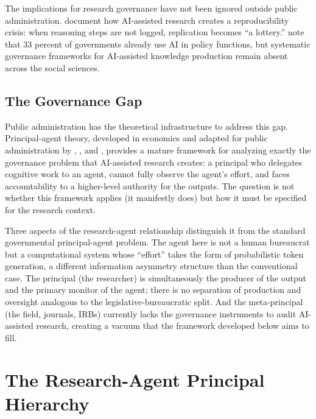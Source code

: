 \documentclass[12pt]{article}
\begin{document}
The implications for research governance have not been ignored outside public administration.
\citet{elephantinthelab2025reproducibility} document how AI-assisted research creates a
reproducibility crisis: when reasoning steps are not logged, replication becomes ``a lottery.''
\citet{oecd2025governing} note that 33 percent of governments already use AI in policy
functions, but systematic governance frameworks for AI-assisted knowledge production remain
absent across the social sciences.

\subsection{The Governance Gap}

Public administration has the theoretical infrastructure to address this gap. Principal-agent
theory, developed in economics \citep{jensen1976theory} and adapted for public administration
by \citet{mitnick1973politicaleconomy}, \citet{moe1984neweconomics}, and \citet{waterman1998agents},
provides a mature framework for analyzing exactly the governance problem that AI-assisted
research creates: a principal who delegates cognitive work to an agent, cannot fully observe
the agent's effort, and faces accountability to a higher-level authority for the outputs. The
question is not whether this framework applies (it manifestly does) but how it must be
specified for the research context.

Three aspects of the research-agent relationship distinguish it from the standard governmental
principal-agent problem. The agent here is not a human bureaucrat but a computational system
whose ``effort'' takes the form of probabilistic token generation, a different information
asymmetry structure than the conventional case. The principal (the researcher) is simultaneously
the producer of the output and the primary monitor of the agent; there is no separation of
production and oversight analogous to the legislative-bureaucratic split. And the meta-principal
(the field, journals, IRBs) currently lacks the governance instruments to audit AI-assisted
research, creating a vacuum that the framework developed below aims to fill.

\section{The Research-Agent Principal Hierarchy}
\end{document}
